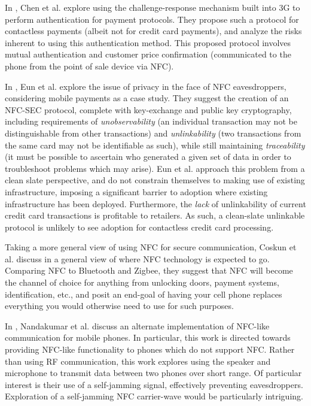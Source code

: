 
In \cite{chen2010using}, Chen et al. explore using the challenge-response mechanism built into 3G to perform authentication for payment protocols.
They propose such a protocol for contactless payments (albeit not for credit card payments), and analyze the risks inherent to using this authentication method.
This proposed protocol involves mutual authentication and customer price confirmation (communicated to the phone from the point of sale device via NFC).

In \cite{eun2013conditional}, Eun et al. explore the issue of privacy in the face of NFC eavesdroppers, considering mobile payments as a case study.
They suggest the creation of an NFC-SEC protocol, complete with key-exchange and public key cryptography, including requirements of
    \emph{unobservability} (an individual transaction may not be distinguishable from other transactions) and
    \emph{unlinkability} (two transactions from the same card may not be identifiable as such), while still maintaining
    \emph{traceability} (it must be possible to ascertain who generated a given set of data in order to troubleshoot problems which may arise).
Eun et al. approach this problem from a clean slate perspective, and do not constrain themselves to making use of existing infrastructure,
    imposing a significant barrier to adoption where existing infrastructure has been deployed.
Furthermore, the \emph{lack} of unlinkability of current credit card transactions is profitable to retailers.
As such, a clean-slate unlinkable protocol is unlikely to see adoption for contactless credit card processing.

Taking a more general view of using NFC for secure communication,
    Coskun et al. discuss in \cite{Coskun2013} a general view of where NFC technology is expected to go.
Comparing NFC to Bluetooth and Zigbee, they suggest that NFC will become the channel of choice for anything from unlocking doors, payment systems, identification, etc.,
    and posit an end-goal of having your cell phone replaces everything you would otherwise need to use for such purposes.

In \cite{nandakumar2013dhwani}, Nandakumar et al. discuss an alternate implementation of NFC-like communication for mobile phones.
In particular, this work is directed towards providing NFC-like functionality to phones which do not support NFC.
Rather than using RF communication, this work explores using the speaker and microphone to transmit data between two phones over short range.
Of particular interest is their use of a self-jamming signal, effectively preventing eavesdroppers.
Exploration of a self-jamming NFC carrier-wave would be particularly intriguing.
